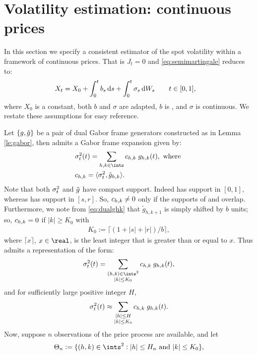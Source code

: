 \section{Volatility estimation: continuous prices } \label{sec:estimator}
In this section we specify a consistent estimator of the spot volatility within a framework of continuous prices. That is $J_t = 0$ and \eqref{eq:semimartingale} reduces to:
\begin{align}
  X_t & = X_0 + \int_0^t b_s \D s + \int_0^t \sigma_s \D W_s    \qquad t \in [0,1] 
  \label{eq:contsemimartingale},
\end{align}
where $X_0$ is a constant, both $b$ and $\sigma$ are adapted, $b$ is \cadlag, and $\sigma$ is continuous.    We restate these assumptions for easy reference.

Let $\{g, \tilde{g}\}$ be a pair of dual Gabor frame generators constructed as in Lemma \ref{le:gabor}, then   \sv admits a Gabor frame expansion given by:  
\begin{align}
  &\sv(t)  = \sum_{h,k \in \ints} \chk \;g_{h,k}(t), \text{ where } 
\\
&\chk = \langle \sv, \tilde{g}_{h,k} \rangle. \label{eq:chk}
\end{align}
Note that both $\sigma_t^2$ and $\tilde{g}$ have compact support. Indeed \sv has support in $[0,1]$, whereas  \tg has support in $[s,r]$. So, ${c}_{h,k} \ne 0$ only if  the supports of \sv and \tghk overlap.  Furthermore, we note from \eqref{eq:dualghk} that $\tilde{g}_{h,k+1}$ is simply \tghk shifted by $b$ units; so, ${c}_{h,k} = 0$ if $|k| \ge K_0$ with 
\begin{align}
  K_0:= \lceil ( 1 + |s| + |r|)/b \rceil,
\end{align}
where $\lceil x\rceil$, $x \in \real$, is the least  integer that is greater than or equal to   $x$.  Thus \sv admits a  representation of the form: 
\begin{align}
  \sv(t) =  \sum_{\substack{(h,k) \in \ints^2\\\vert k \vert \le K_0}} \chk\;g_{h,k}(t) ,\notag
\end{align}
and  for sufficiently large positive integer $H$, 
 \begin{align}
 \sigma_t^2(t) \approx \sum_{\substack{\vert h \vert \le H \\\vert k \vert \le K_0}} {c}_{h,k}\;g_{h,k}(t). \notag
  \notag
   \label{}
 \end{align}
 Now, suppose $n$ observations of the price process are available, and let 
\begin{align}
  \Theta_n := \{(h,k) \in \ints^2 : |h| \le H_n \text{ and }|k| \le K_0\},
  \label{eq:theta}
\end{align}
